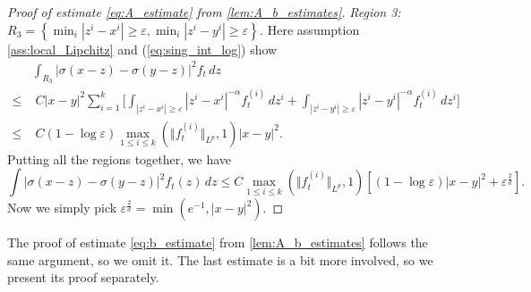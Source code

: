 \documentclass[10pt,oneside]{amsart}
\numberwithin{equation}{section}
\numberwithin{definition}{section}
\numberwithin{theorem}{section}
\numberwithin{lemma}{section}
\begin{document}
\begin{proof}[Proof of estimate \cref{eq:A_estimate} from \cref{lem:A_b_estimates}]
  \textit{Region 3: $R_{3}=\left\{ \min_{i}|z^{i}-x^{i}|\geq\varepsilon,\min_{i}|z^{i}-y^{i}|\geq\varepsilon\right\}$.} Here assumption \ref{ass:local_Lipchitz} and (\ref{eq:sing_int_log}) show
  \begin{align*}
    & \int_{R_{3}}|\sigma(x-z)-\sigma(y-z)|^{2}f_{t}\,dz \\
    \leq&\;  C|x-y|^{2} \sum_{i=1}^{k}\bigg[\int_{|z^{i}-x^{i}|\geq\varepsilon}|z^{i}-x^{i}|^{-\alpha}f_{t}^{(i)}\,dz^{i}
    +\int_{|z^{i}-y^{i}|\geq\varepsilon}|z^{i}-y^{i}|^{-\alpha}f_{t}^{(i)}\,dz^{i}\bigg] \\
    \leq &\;  C\left(1-\log\varepsilon\right)\max_{1\leq i \leq k}(\Vert f_{t}^{(i)}\Vert _{L^{p}},1)|x-y|^{2}.
  \end{align*}
  Putting all the regions together, we have
  \begin{equation*}
    \int\left|\sigma(x-z)-\sigma(y-z)\right|^{2}f_{t}(z)\,dz\leq C \max_{1\leq i \leq k}(\Vert f_{t}^{(i)}\Vert _{L^{p}},1)\left[\left(1-\log\varepsilon\right)|x-y|^{2}+\varepsilon^{\frac{2}{d}}\right].
  \end{equation*}
  Now we simply pick $\varepsilon^{\frac{2}{d}}=\min( e^{-1},|x-y|^2)$.
\end{proof}

The proof of estimate \cref{eq:b_estimate} from \cref{lem:A_b_estimates} follows the same argument, so we omit it. The last estimate is a bit more involved, so we present its proof separately.
\end{document}
